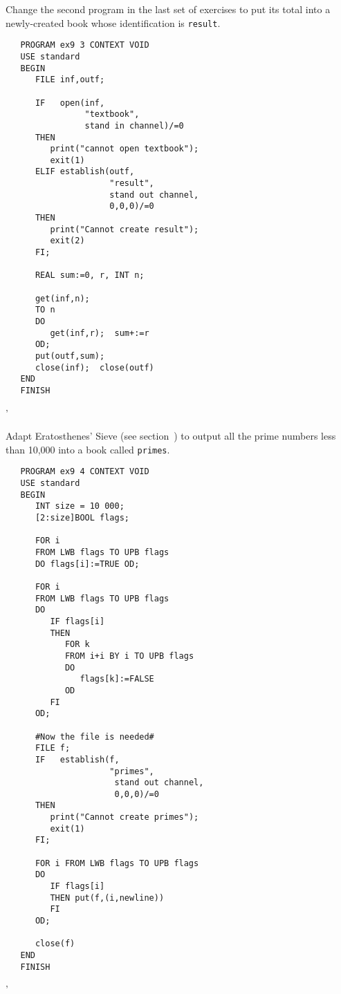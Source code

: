 \begin{exercise}
\item Change the second program in the last set of exercises to put its
total into a newly-created book whose identification is
\verb|result|. \ans \ %
\begin{verbatim}
   PROGRAM ex9 3 CONTEXT VOID
   USE standard
   BEGIN
      FILE inf,outf;

      IF   open(inf,
                "textbook",
                stand in channel)/=0
      THEN
         print("cannot open textbook");
         exit(1)
      ELIF establish(outf,
                     "result",
                     stand out channel,
                     0,0,0)/=0
      THEN
         print("Cannot create result");
         exit(2)
      FI;

      REAL sum:=0, r, INT n;

      get(inf,n);
      TO n
      DO
         get(inf,r);  sum+:=r
      OD;
      put(outf,sum);
      close(inf);  close(outf)
   END
   FINISH
\end{verbatim}
'
\item Adapt Eratosthenes' Sieve (see section~) to
out\-put all the prime numbers less than 10,000 into a book called
\verb|primes|. \ans \ %
\begin{verbatim}
   PROGRAM ex9 4 CONTEXT VOID
   USE standard
   BEGIN
      INT size = 10 000;
      [2:size]BOOL flags;

      FOR i
      FROM LWB flags TO UPB flags
      DO flags[i]:=TRUE OD;

      FOR i
      FROM LWB flags TO UPB flags
      DO
         IF flags[i]
         THEN
            FOR k
            FROM i+i BY i TO UPB flags
            DO
               flags[k]:=FALSE
            OD
         FI
      OD;

      #Now the file is needed#
      FILE f;
      IF   establish(f,
                     "primes",
                      stand out channel,
                      0,0,0)/=0
      THEN
         print("Cannot create primes");
         exit(1)
      FI;

      FOR i FROM LWB flags TO UPB flags
      DO
         IF flags[i]
         THEN put(f,(i,newline))
         FI
      OD;

      close(f)
   END
   FINISH
\end{verbatim}
'
\end{exercise}

